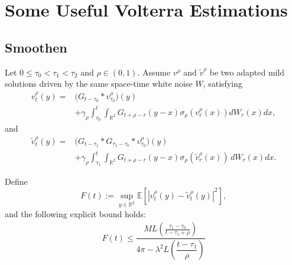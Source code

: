 \section{Some Useful Volterra Estimations}

\subsection{Smoothen}

\begin{proposition}

Let $0\leq \tau_0<\tau_1<\tau_2$ and $\rho\in(0,1)$. Assume $v^\rho$ and $\widetilde v^\rho$ be
two adapted mild solutions driven by the same
space-time white noise $W$, satisfying
\begin{align*}
v_t^\rho(y)
={}&
\bigl(G_{t-\tau_0}*v_{\tau_0}^\rho\bigr)(y)
\\
&+
\gamma_\rho
\int_{\tau_0}^{t}
\int_{\mathbb{R}^2}
G_{t+\rho-r}(y-x)
\sigma_\rho(v_r^\rho(x))dW_r(x)dx,
\end{align*}
and
\begin{align*}
\widetilde v_t^\rho(y)
={}&
\bigl(
G_{t-\tau_1}*
G_{\tau_1-\tau_0}*
v_{\tau_0}^\rho
\bigr)(y)
\\
&+
\gamma_\rho
\int_{\tau_1}^{t}
\int_{\mathbb{R}^2}
G_{t+\rho-r}(y-x)
\sigma_\rho(\widetilde v_r^\rho(x))
\,dW_r(x)dx.
\end{align*}

Define
\[
F(t)
:=
\sup_{y\in\mathbb{R}^2}
\mathbb{E}
\left[
|v_t^\rho(y)-\widetilde v_t^\rho(y)|^2
\right],
\]
and the following explicit bound holds:
\begin{equation*}
\begin{aligned}
F(t)
\leq
\dfrac{ML\left(
\frac{\tau_1-\tau_0}
{t-\tau_1+\rho}
\right)}{4\pi - \lambda^2 L\left(\dfrac{t-\tau_1}{\rho}\right)}
\end{aligned}
\end{equation*}

\end{proposition}


